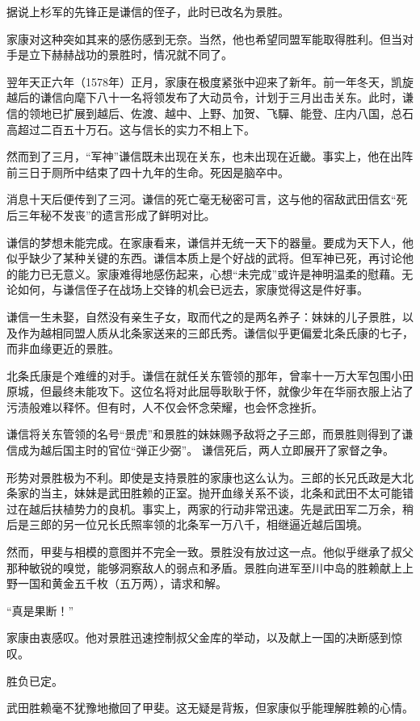 \documentclass[
]{book}
\begin{document}
据说上杉军的先锋正是谦信的侄子，此时已改名为景胜。

家康对这种突如其来的感伤感到无奈。当然，他也希望同盟军能取得胜利。但当对手是立下赫赫战功的景胜时，情况就不同了。

翌年天正六年（1578年）正月，家康在极度紧张中迎来了新年。前一年冬天，凯旋越后的谦信向麾下八十一名将领发布了大动员令，计划于三月出击关东。此时，谦信的领地已扩展到越后、佐渡、越中、上野、加贺、飞驒、能登、庄内八国，总石高超过二百五十万石。这与信长的实力不相上下。

然而到了三月，``军神''谦信既未出现在关东，也未出现在近畿。事实上，他在出阵前三日于厕所中结束了四十九年的生命。死因是脑卒中。

消息十天后便传到了三河。谦信的死亡毫无秘密可言，这与他的宿敌武田信玄``死后三年秘不发丧''的遗言形成了鲜明对比。

谦信的梦想未能完成。在家康看来，谦信并无统一天下的器量。要成为天下人，他似乎缺少了某种关键的东西。谦信本质上是个好战的武将。但军神已死，再讨论他的能力已无意义。家康难得地感伤起来，心想``未完成''或许是神明温柔的慰藉。无论如何，与谦信侄子在战场上交锋的机会已远去，家康觉得这是件好事。

谦信一生未娶，自然没有亲生子女，取而代之的是两名养子：妹妹的儿子景胜，以及作为越相同盟人质从北条家送来的三郎氏秀。谦信似乎更偏爱北条氏康的七子，而非血缘更近的景胜。

北条氏康是个难缠的对手。谦信在就任关东管领的那年，曾率十一万大军包围小田原城，但最终未能攻下。这位名将对此屈辱耿耿于怀，就像少年在华丽衣服上沾了污渍般难以释怀。但有时，人不仅会怀念荣耀，也会怀念挫折。

谦信将关东管领的名号``景虎''和景胜的妹妹赐予敌将之子三郎，而景胜则得到了谦信成为越后国主时的官位``弹正少弼''。
谦信死后，两人立即展开了家督之争。

形势对景胜极为不利。即使是支持景胜的家康也这么认为。三郎的长兄氏政是大北条家的当主，妹妹是武田胜赖的正室。抛开血缘关系不谈，北条和武田不太可能错过在越后扶植势力的良机。事实上，两家的行动非常迅速。先是武田军二万余，稍后是三郎的另一位兄长氏照率领的北条军一万八千，相继逼近越后国境。

然而，甲斐与相模的意图并不完全一致。景胜没有放过这一点。他似乎继承了叔父那种敏锐的嗅觉，能够洞察敌人的弱点和矛盾。景胜向进军至川中岛的胜赖献上上野一国和黄金五千枚（五万两），请求和解。

``真是果断！''

家康由衷感叹。他对景胜迅速控制叔父金库的举动，以及献上一国的决断感到惊叹。

胜负已定。

武田胜赖毫不犹豫地撤回了甲斐。这无疑是背叛，但家康似乎能理解胜赖的心情。
\end{document}
